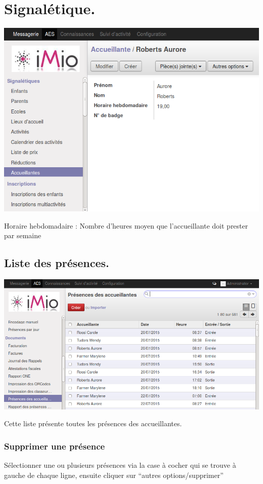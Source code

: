 \documentclass[letterpaper,10pt,english]{sphinxmanual}
\begin{document}
\section{Signalétique.}
\label{accueillantes:signaletique}
\includegraphics{accueillante_signa.png}

Horaire hebdomadaire : Nombre d'heures moyen que l'accueillante doit prester par semaine


\subsection{Liste des présences.}
\label{accueillantes:liste-des-presences}
\includegraphics{accueillante_liste_des_presences.png}

Cette liste présente toutes les présences des accueillantes.


\subsubsection{Supprimer une présence}
\label{accueillantes:supprimer-une-presence}
Sélectionner une ou plusieurs présences via la case à cocher qui se trouve à gauche de chaque ligne,
ensuite cliquer sur ``autres options/supprimer''
\end{document}
